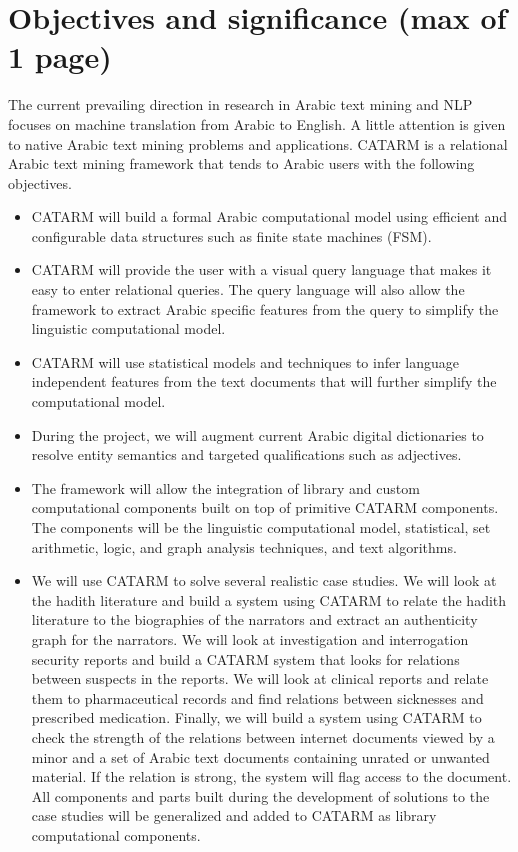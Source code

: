 \documentclass[12pt]{article}
\begin{document}
\pagebreak

\section{Objectives and significance (max of 1 page) } 
\label{s:objectives}

The current prevailing direction in research 
in Arabic text mining and NLP focuses on machine translation from 
Arabic to English. 
A little attention is given to native Arabic text mining 
problems and applications. 
CATARM is a relational Arabic text mining 
framework that tends to Arabic users 
with the following objectives.

\begin{itemize}\itemsep0pt
\item CATARM will build a formal Arabic computational model
using efficient and configurable data structures such as 
finite state machines (FSM). 
\item CATARM will provide the user with a visual query 
language that makes it easy to enter relational queries. 
The query language will also allow the framework to extract Arabic
specific features from the query to simplify the linguistic 
computational model. 
\item CATARM will use statistical models and techniques
to infer language independent features from the text documents
that will further simplify the computational model. 
\item During the project, we will augment current Arabic digital 
dictionaries to resolve entity semantics and targeted 
qualifications such as adjectives.
\item The framework will allow the integration of library and 
custom computational components built on top of primitive
CATARM components. 
The components will be the linguistic computational model,
statistical, set arithmetic, logic,
and graph analysis techniques, and  text algorithms.
\item We will use CATARM to solve several realistic case studies.
We will look at the hadith literature and build a system using
CATARM to relate the hadith literature to the biographies of the
narrators and extract an authenticity graph for the narrators.
We will look at investigation and interrogation security reports
and build a CATARM system that looks for relations between suspects
in the reports. 
We will look at clinical reports and relate them to pharmaceutical 
records and find relations between sicknesses and prescribed medication. 
Finally, we will build a system using CATARM to check the strength
of the relations between internet documents viewed by a minor and
a set of Arabic text documents containing unrated or unwanted 
material. If the relation is strong, the system will flag access to
the document. 
All components and parts built during the development of solutions
to the case studies will be generalized and added to CATARM as 
library computational components. 
\end{itemize}
\end{document}
